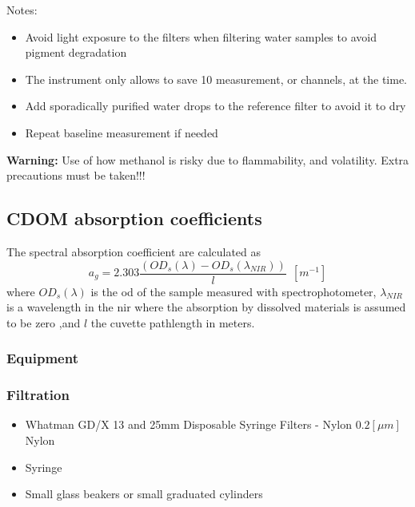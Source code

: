 \begin{appendices}
Notes:
\begin{itemize}[itemsep=2pt,parsep=2pt]
  \item Avoid light exposure to the filters when filtering water samples to avoid pigment degradation
  \item The instrument only allows to save 10 measurement, or channels, at the time. 
  \item Add sporadically purified water drops to the reference filter to avoid it to dry
  \item Repeat baseline measurement if needed
\end{itemize}  
{\bf Warning:}  Use of how methanol is risky due to flammability, and volatility. Extra precautions must be taken!!!


\subsection{CDOM absorption coefficients}
The spectral absorption coefficient are calculated as \cite{Mitchell2002}
\begin{equation}
  a_g=2.303 \frac{(OD_s(\lambda)-OD_s(\lambda_{NIR}))}{l}~~[m^{-1}]
\end{equation}
\noindent where $OD_s(\lambda)$ is the \gls{od} of the sample measured with spectrophotometer, $\lambda_{NIR}$ is a wavelength in the \gls{nir} where the absorption by dissolved materials is assumed to be zero ,and $l$ the cuvette pathlength in meters.

\subsubsection{Equipment}
\subsubsection*{Filtration}
\begin{itemize}[itemsep=2pt,parsep=2pt]
  \item Whatman GD/X 13 and 25mm Disposable Syringe Filters - Nylon $0.2[\mu m]$ Nylon
  \item Syringe
  \item Small glass beakers or small graduated cylinders
\end{itemize}

\end{appendices}
